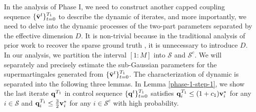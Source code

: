 In the analysis of Phase I, 
 we need to construct another capped coupling sequence $\{\bar{\mathbf{v}}^t\}_{t=0}^{T_1}$ to describe the dynamic of iterates, and more importantly, we need to delve into the dynamic processes of the two-part parameters separated by the effective dimension $D$. It is non-trivial because in the traditional analysis of prior work to recover the sparse ground truth \citep{haochen21shape}, it is unnecessary to  introduce $D$. %
In our analysis, we partition the interval $[1:M]$ into $\mathcal{S}$ and $\mathcal{S}^c$. We will separately and precisely estimate the sub-Gaussian parameters for the supermartingales generated from $\{\bar{\mathbf{v}}^t\}_{t=0}^{T_1}$. The characterization of dynamic is separated into the following three lemmas. In Lemma \ref{phase-1-step-1}, 
we show the last iterate $\mathbf{q}^{T_1}$ in control sequence $\{\mathbf{q}^t\}_{t=0}^{T_1}$ satisfies $\mathbf{q}_i^{T_1}\leq (1+c_1)\mathbf{v}_i^*$ for any $i\in\mathcal{S}$ and $\mathbf{q}_i^{T_1}\leq\frac{3}{2}\mathbf{v}_i^*$ for any $i\in\mathcal{S}^c$ with high probability.



